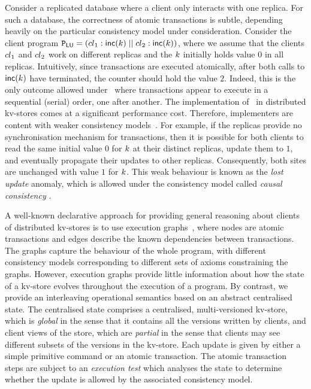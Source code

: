 Consider a replicated database where
a client only interacts with one replica.
For such a database, the 
correctness of atomic transactions is subtle, depending heavily on the
particular consistency model under consideration.  
Consider the client program
$\mathtt{P}_{\mathsf{LU}} = \left({cl}_1 : \mathsf{inc}(k) \;|| \; {cl}_2:
  \mathsf{inc}(k) \right)$, 
where we assume that the clients \( {cl}_1 \) and \( {cl}_2 \) work on different replicas and
the $k$ initially holds value $0$ in all replicas.
Intuitively, since transactions are executed atomically, after both
calls to $\mathsf{inc}(k)$ have terminated, the counter should hold 
the value $2$.
Indeed, this is the only outcome allowed under 
\SER\, where transactions
appear to execute in a sequential (serial) order, one after another.
The implementation of  \SER\ in distributed kv-stores comes at a
significant performance cost. Therefore, implementers are content with
{weaker} consistency models~\cite{ramp,rola,cops,wren,redblue,PSI,NMSI,gdur,clocksi,distrsi}. 
For example, if the replicas provide no synchronisation mechanism for transactions,
then it is possible for both clients to read the same initial value $0$ for $k$ at their
distinct replicas, update them to $1$, and eventually propagate their updates to other replicas. 
Consequently, both
sites  are unchanged with value  $1$ for $k$.
This weak behaviour is known as the \emph{lost update} anomaly, which
is  allowed under the consistency model called {\em causal consistency} \cite{cops,wren,redblue}.



A well-known declarative approach for providing general reasoning
about clients of distributed kv-stores is to use  execution 
graphs~\cite{adya-icde,adya,framework-concur,ev_transactions},
where nodes are atomic transactions and edges describe the
known dependencies between transactions. The graphs capture the
behaviour of the whole program, with different consistency models
corresponding to different sets of axioms constraining the graphs. 
However, execution graphs provide little information about how the 
state of a kv-store evolves throughout the execution of a program.
By contrast, we provide an interleaving operational semantics based on an
abstract centralised state. The centralised state comprises a
centralised, multi-versioned kv-store, which is {\em global} in the
sense that it contains all the versions written by clients, and client views of the store,
which are {\em partial} in the sense that clients may see different 
subsets of the versions in the kv-store. Each update is given by either
a simple primitive command or an atomic transaction. The atomic
transaction steps are subject to an {\em execution test} which
analyses the state to determine whether the update is allowed by 
the associated  consistency model. 



